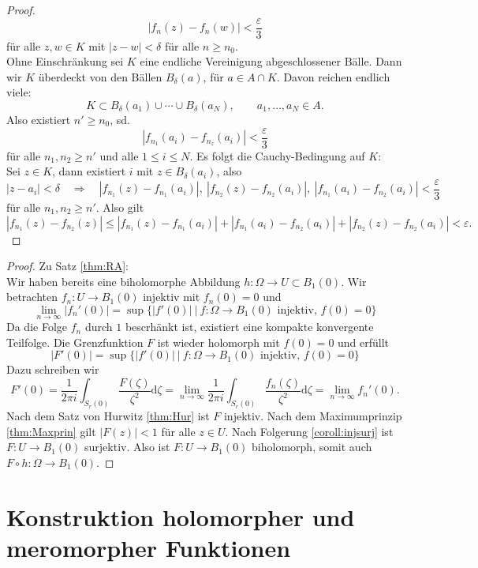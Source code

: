 \documentclass[11pt,titlepage]{article}
\theoremstyle{definition}
\theoremstyle{remark}
\begin{document}
\begin{proof}
		\[ |f_n(z)-f_n(w)|<\frac{\varepsilon}{3} \]
		für alle $z,w\in K$ mit $|z-w|<\delta$ für alle $n\geq n_0$. \\
		Ohne Einschränkung sei $K$ eine endliche Vereinigung abgeschlossener Bälle. Dann wir $K$ überdeckt 
		von den Bällen $B_{\delta}(a)$, für $a\in A\cap K$. Davon reichen endlich viele:
		\[ K\subset B_{\delta}(a_1)\cup \cdots\cup B_{\delta}(a_N), \qquad a_1,\ldots,a_N\in A. \]
		Also existiert $n'\geq n_0$, sd.
		\[ |f_{n_1}(a_i)-f_{n_z}(a_i)|<\frac{\varepsilon}{3} \]
		für alle $n_1,n_2\geq n'$ und alle $1\leq i\leq N$. Es folgt die Cauchy-Bedingung auf $K$: \\
		Sei $z\in K$, dann existiert $i$ mit $z\in B_{\delta}(a_i)$, also
		\[ |z-a_i|<\delta \quad \Rightarrow\quad |f_{n_1}(z)-f_{n_1}(a_i)|,\ |f_{n_2}(z)-f_{n_2}(a_i)|,\ 
		|f_{n_1}(a_i)-f_{n_2}(a_i)|<\frac{\varepsilon}{3} \]
		für alle $n_1,n_2\geq n'$. Also gilt
		\[ |f_{n_1}(z)-f_{n_2}(z)|\leq |f_{n_1}(z)-f_{n_1}(a_i)|+|f_{n_1}(a_i)-f_{n_2}(a_i)|+|f_{n_2}(z)-f_{n_2}(a_i)| < 
		\varepsilon. \]
	\end{proof}
	
	\begin{proof}
		Zu Satz \ref{thm:RA}: \\
		Wir haben bereits eine biholomorphe Abbildung $h:\Omega\to U\subset B_1(0)$. Wir betrachten 
		$f_n: U\to B_1(0)$ injektiv mit $f_n(0)=0$ und
		\[ \lim_{n\to\infty} |f_n'(0)|=\sup \{ |f'(0)|\ \vert\ f:\Omega\to B_1(0)\text{ injektiv, } f(0)=0 \} \]
		Da die Folge $f_n$ durch $1$ bescrhänkt ist, existiert eine kompakte konvergente Teilfolge. 
		Die Grenzfunktion $F$ ist wieder holomorph mit $f(0)=0$ und erfüllt
		\[ |F'(0)|=\sup \{ |f'(0)|\ \vert\ f:\Omega\to B_1(0)\text{ injektiv, } f(0)=0 \} \]
		Dazu schreiben wir
		\[F'(0)=\frac{1}{2\pi i} \int_{S_r(0)} \frac{F(\zeta)}{\zeta^2}\mathrm{d}\zeta =\lim_{n\to\infty} \frac{1}{2\pi i} 
		\int_{S_r(0)}\frac{f_n(\zeta)}{\zeta^2}\mathrm{d}\zeta = \lim_{n\to\infty} f_n'(0). \]
		Nach dem Satz von Hurwitz \ref{thm:Hur} ist $F$ injektiv. Nach dem Maximumprinzip \ref{thm:Maxprin} 
		gilt $|F(z)|<1$ für alle 
		$z\in U$. Nach Folgerung \ref{coroll:injsurj} 
		ist $F:U\to B_1(0)$ surjektiv. Also ist $F:U\to B_1(0)$ biholomorph, somit auch 
		$F\circ h:\Omega\to B_1(0)$.
	\end{proof}

	\section{Konstruktion holomorpher und meromorpher Funktionen}
	
\end{document}
